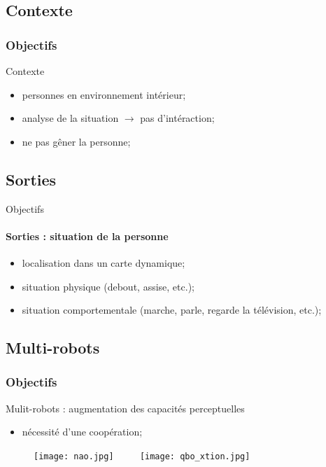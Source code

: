 \documentclass[usepdftitle=false, xcolor=dvipsnames, 12, c]{beamer}
\begin{document}
\subsection{Contexte}
\begin{frame}[label=objContexte]
  \frametitle{Objectifs}
  Contexte
  \begin{itemize}
      \item[] personnes en environnement intérieur;
      \item[] analyse de la situation $\rightarrow$ pas d'intéraction;
      \item[] ne pas gêner la personne;
  \end{itemize}
\end{frame}

\subsection{Sorties}
\begin{frame}[label=objSorties]
  Objectifs
  \framesubtitle{Sorties : situation de la personne}
    \begin{itemize}
        \item[] localisation dans un carte dynamique;
        \item[] situation physique (debout, assise, etc.);
        \item[] situation comportementale (marche, parle, regarde la télévision, etc.);
    \end{itemize}
\end{frame}

\subsection{Multi-robots}
\begin{frame}[label=objMultirobots]
  \frametitle{Objectifs}
    Mulit-robots : augmentation des capacités perceptuelles
    \begin{itemize}
        \item[] nécessité d'une coopération;
    \end{itemize}
    \begin{figure}[p]
      \texttt{[image: nao.jpg]} ~~~~ \texttt{[image: qbo\_xtion.jpg]}
    \end{figure}
\end{frame}

\end{document}
